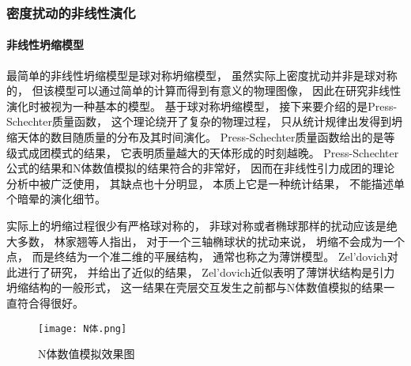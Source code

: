 \documentclass[8pt]{beamer}
\begin{document}
        \begin{frame}[fragile]
            \frametitle{密度扰动的非线性演化}
            \framesubtitle{非线性坍缩模型}
            \begin{multicols}{2} 
                \qquad
                最简单的非线性坍缩模型是球对称坍缩模型，
                虽然实际上密度扰动并非是球对称的，
                但该模型可以通过简单的计算而得到有意义的物理图像，
                因此在研究非线性演化时被视为一种基本的模型。
                基于球对称坍缩模型，
                接下来要介绍的是Press-Schechter质量函数，
                这个理论绕开了复杂的物理过程，
                只从统计规律出发得到坍缩天体的数目随质量的分布及其时间演化。
                Press-Schechter质量函数给出的是等级式成团模式的结果，
                它表明质量越大的天体形成的时刻越晚。
                Press-Schechter公式的结果和N体数值模拟的结果符合的非常好，
                因而在非线性引力成团的理论分析中被广泛使用，
                其缺点也十分明显，
                本质上它是一种统计结果，
                不能描述单个暗晕的演化细节。

                \qquad
                实际上的坍缩过程很少有严格球对称的，
                非球对称或者椭球那样的扰动应该是绝大多数，
                林家翘等人指出，
                对于一个三轴椭球状的扰动来说，
                坍缩不会成为一个点，
                而是终结为一个准二维的平展结构，
                通常也称之为薄饼模型。
                Zel'dovich对此进行了研究，
                并给出了近似的结果，
                Zel'dovich近似表明了薄饼状结构是引力坍缩结构的一般形式，
                这一结果在壳层交互发生之前都与N体数值模拟的结果一直符合得很好。

                \begin{figure}[h]
                    \centering
                    \texttt{[image: N体.png]}  
                    \caption{N体数值模拟效果图}
                \end{figure}
            \end{multicols}
        \end{frame}
\end{document}
